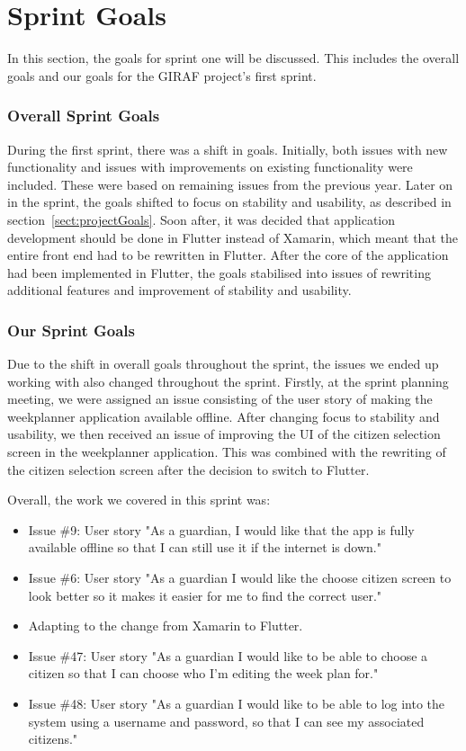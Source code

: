 \section{Sprint Goals}
In this section, the goals for sprint one will be discussed. This includes the overall goals and our goals for the GIRAF project's first sprint.

\subsubsection{Overall Sprint Goals} 
\label{sect:1SprintGoals}
During the first sprint, there was a shift in goals. Initially, both issues with new functionality and issues with improvements on existing functionality were included. These were based on remaining issues from the previous year. Later on in the sprint, the goals shifted to focus on stability and usability, as described in section~\ref{sect:projectGoals}.
Soon after, it was decided that application development should be done in Flutter instead of Xamarin, which meant that the entire front end had to be rewritten in Flutter.
After the core of the application had been implemented in Flutter, the goals stabilised into issues of rewriting additional features and improvement of stability and usability.

\subsubsection{Our Sprint Goals}
Due to the shift in overall goals throughout the sprint, the issues we ended up working with also changed throughout the sprint. Firstly, at the sprint planning meeting, we were assigned an issue consisting of the user story of making the weekplanner application available offline.
After changing focus to stability and usability, we then received an issue of improving the UI of the citizen selection screen in the weekplanner application. This was combined with the rewriting of the citizen selection screen after the decision to switch to Flutter.

Overall, the work we covered in this sprint was:
\begin{itemize}
    \item Issue \#9: User story "As a guardian, I would like that the app is fully available offline so that I can still use it if the internet is down."
    \item Issue \#6: User story "As a guardian I would like the choose citizen screen to look better so it makes it easier for me to find the correct user."
    \item Adapting to the change from Xamarin to Flutter.
    \item Issue \#47: User story "As a guardian I would like to be able to choose a citizen so that I can choose who I’m editing the week plan for."
    \item Issue \#48: User story "As a guardian I would like to be able to log into the system using a username and password, so that I can see my associated citizens."
\end{itemize}
